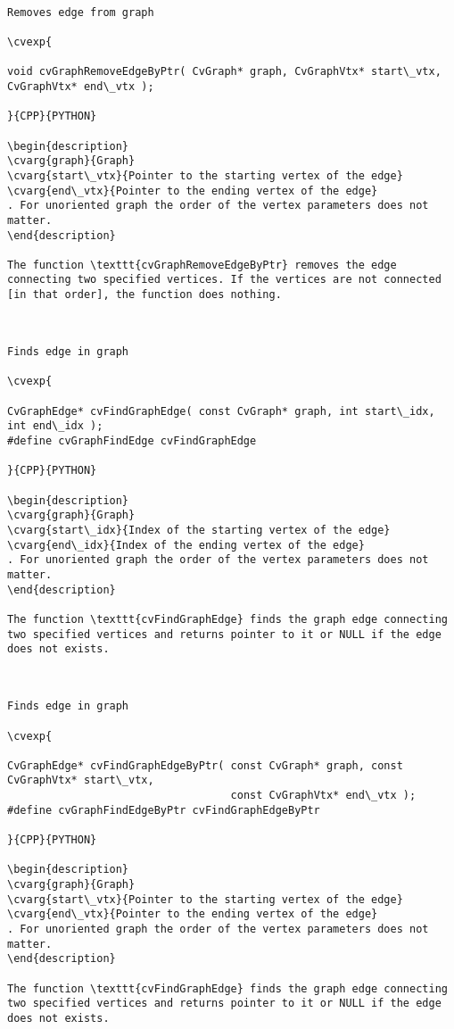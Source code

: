 \begin{verbatim}

Removes edge from graph

\cvexp{

void cvGraphRemoveEdgeByPtr( CvGraph* graph, CvGraphVtx* start\_vtx, CvGraphVtx* end\_vtx );

}{CPP}{PYTHON}

\begin{description}
\cvarg{graph}{Graph}
\cvarg{start\_vtx}{Pointer to the starting vertex of the edge}
\cvarg{end\_vtx}{Pointer to the ending vertex of the edge}
. For unoriented graph the order of the vertex parameters does not matter.
\end{description}

The function \texttt{cvGraphRemoveEdgeByPtr} removes the edge connecting two specified vertices. If the vertices are not connected [in that order], the function does nothing.


\end{verbatim}
\begin{verbatim}

Finds edge in graph

\cvexp{

CvGraphEdge* cvFindGraphEdge( const CvGraph* graph, int start\_idx, int end\_idx );
#define cvGraphFindEdge cvFindGraphEdge

}{CPP}{PYTHON}

\begin{description}
\cvarg{graph}{Graph}
\cvarg{start\_idx}{Index of the starting vertex of the edge}
\cvarg{end\_idx}{Index of the ending vertex of the edge}
. For unoriented graph the order of the vertex parameters does not matter.
\end{description}

The function \texttt{cvFindGraphEdge} finds the graph edge connecting two specified vertices and returns pointer to it or NULL if the edge does not exists.


\end{verbatim}
\begin{verbatim}

Finds edge in graph

\cvexp{

CvGraphEdge* cvFindGraphEdgeByPtr( const CvGraph* graph, const CvGraphVtx* start\_vtx,
                                   const CvGraphVtx* end\_vtx );
#define cvGraphFindEdgeByPtr cvFindGraphEdgeByPtr

}{CPP}{PYTHON}

\begin{description}
\cvarg{graph}{Graph}
\cvarg{start\_vtx}{Pointer to the starting vertex of the edge}
\cvarg{end\_vtx}{Pointer to the ending vertex of the edge}
. For unoriented graph the order of the vertex parameters does not matter.
\end{description}

The function \texttt{cvFindGraphEdge} finds the graph edge connecting two specified vertices and returns pointer to it or NULL if the edge does not exists.


\end{verbatim}
